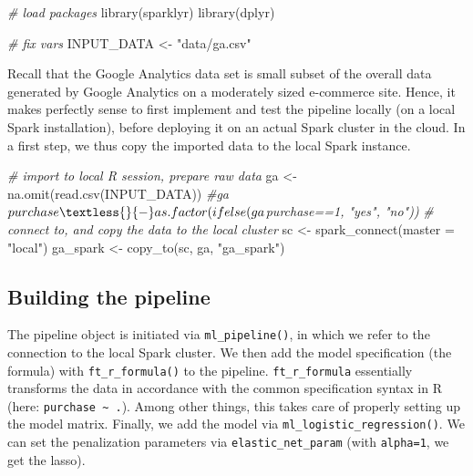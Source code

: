 \documentclass[
  12pt,
]{style/krantz}
\newenvironment{Shaded}{\begin{snugshade}}{\end{snugshade}}
\newcommand{\AttributeTok}[1]{\textcolor[rgb]{0.77,0.63,0.00}{#1}}
\newcommand{\CommentTok}[1]{\textcolor[rgb]{0.56,0.35,0.01}{\textit{#1}}}
\newcommand{\FunctionTok}[1]{\textcolor[rgb]{0.00,0.00,0.00}{#1}}
\newcommand{\NormalTok}[1]{#1}
\newcommand{\OtherTok}[1]{\textcolor[rgb]{0.56,0.35,0.01}{#1}}
\newcommand{\StringTok}[1]{\textcolor[rgb]{0.31,0.60,0.02}{#1}}
\begin{document}
\begin{Shaded}
\begin{Highlighting}[]
\CommentTok{\# load packages}
\FunctionTok{library}\NormalTok{(sparklyr)}
\FunctionTok{library}\NormalTok{(dplyr)}

\CommentTok{\# fix vars}
\NormalTok{INPUT\_DATA }\OtherTok{\textless{}{-}} \StringTok{"data/ga.csv"}
\end{Highlighting}
\end{Shaded}

Recall that the Google Analytics data set is small subset of the overall data generated by Google Analytics on a moderately sized e-commerce site. Hence, it makes perfectly sense to first implement and test the pipeline locally (on a local Spark installation), before deploying it on an actual Spark cluster in the cloud. In a first step, we thus copy the imported data to the local Spark instance.

\begin{Shaded}
\begin{Highlighting}[]
\CommentTok{\# import to local R session, prepare raw data}
\NormalTok{ga }\OtherTok{\textless{}{-}} \FunctionTok{na.omit}\NormalTok{(}\FunctionTok{read.csv}\NormalTok{(INPUT\_DATA))}
\CommentTok{\#ga$purchase \textless{}{-} as.factor(ifelse(ga$purchase==1, "yes", "no"))}
\CommentTok{\# connect to, and copy the data to the local cluster}
\NormalTok{sc }\OtherTok{\textless{}{-}} \FunctionTok{spark\_connect}\NormalTok{(}\AttributeTok{master =} \StringTok{"local"}\NormalTok{)}
\NormalTok{ga\_spark }\OtherTok{\textless{}{-}} \FunctionTok{copy\_to}\NormalTok{(sc, ga, }\StringTok{"ga\_spark"}\NormalTok{)}
\end{Highlighting}
\end{Shaded}

\hypertarget{building-the-pipeline}{%
\subsection{Building the pipeline}\label{building-the-pipeline}}

The pipeline object is initiated via \texttt{ml\_pipeline()}, in which we refer to the connection to the local Spark cluster. We then add the model specification (the formula) with \texttt{ft\_r\_formula()} to the pipeline. \texttt{ft\_r\_formula} essentially transforms the data in accordance with the common specification syntax in R (here: \texttt{purchase\ \textasciitilde{}\ .}). Among other things, this takes care of properly setting up the model matrix. Finally, we add the model via \texttt{ml\_logistic\_regression()}. We can set the penalization parameters via \texttt{elastic\_net\_param} (with \texttt{alpha=1}, we get the lasso).
\end{document}
